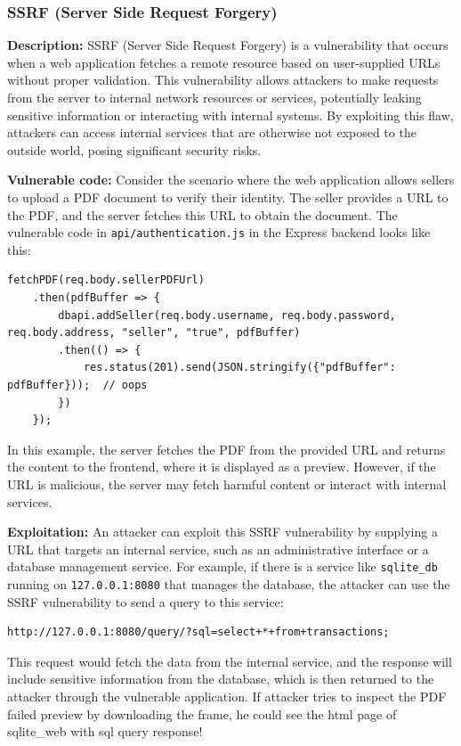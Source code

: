 \documentclass[]{article}
\begin{document}
\subsubsection{SSRF (Server Side Request Forgery)}

\textbf{Description:}
SSRF (Server Side Request Forgery) is a vulnerability that occurs when a web application fetches a remote resource based on user-supplied URLs without proper validation. This vulnerability allows attackers to make requests from the server to internal network resources or services, potentially leaking sensitive information or interacting with internal systems. By exploiting this flaw, attackers can access internal services that are otherwise not exposed to the outside world, posing significant security risks.

\textbf{Vulnerable code:}
Consider the scenario where the web application allows sellers to upload a PDF document to verify their identity. The seller provides a URL to the PDF, and the server fetches this URL to obtain the document. The vulnerable code in \texttt{api/authentication.js} in the Express backend looks like this:

\begin{lstlisting}
fetchPDF(req.body.sellerPDFUrl)
    .then(pdfBuffer => {
        dbapi.addSeller(req.body.username, req.body.password, req.body.address, "seller", "true", pdfBuffer)
        .then(() => {
            res.status(201).send(JSON.stringify({"pdfBuffer": pdfBuffer}));  // oops
        })
    });
\end{lstlisting}

In this example, the server fetches the PDF from the provided URL and returns the content to the frontend, where it is displayed as a preview. However, if the URL is malicious, the server may fetch harmful content or interact with internal services.

\textbf{Exploitation:}
An attacker can exploit this SSRF vulnerability by supplying a URL that targets an internal service, such as an administrative interface or a database management service. For example, if there is a service like \texttt{sqlite\_db} running on \texttt{127.0.0.1:8080} that manages the database, the attacker can use the SSRF vulnerability to send a query to this service:

\begin{lstlisting}
http://127.0.0.1:8080/query/?sql=select+*+from+transactions;
\end{lstlisting}

This request would fetch the data from the internal service, and the response will include sensitive information from the database, which is then returned to the attacker through the vulnerable application. If attacker tries to inspect the PDF failed preview by downloading the frame, he could see the html page of sqlite\_web with sql query response!
\end{document}
